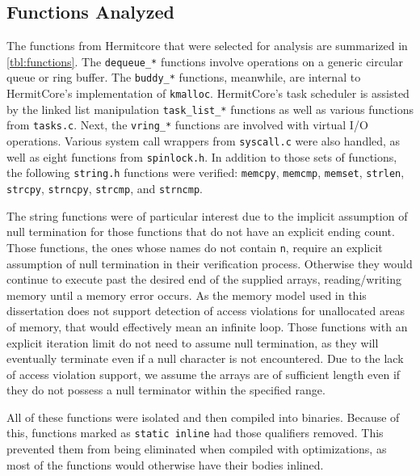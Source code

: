 \subsection{Functions Analyzed}
The functions from Hermitcore that were selected for analysis are summarized in \cref{tbl:functions}.
The \lstinline|dequeue_*| functions involve operations on a generic circular queue or ring buffer.
The \lstinline|buddy_*| functions, meanwhile,
are internal to HermitCore's implementation of \lstinline|kmalloc|.
HermitCore's task scheduler is assisted by the linked list manipulation \lstinline|task_list_*| functions
as well as various functions from \lstinline|tasks.c|.
Next, the \lstinline|vring_*| functions are involved with virtual I/O operations.
Various system call wrappers from \lstinline|syscall.c| were also handled,
as well as eight functions from \lstinline|spinlock.h|.
In addition to those sets of functions,
the following \lstinline|string.h| functions were verified:
\lstinline|memcpy|, \lstinline|memcmp|, \lstinline|memset|, \lstinline|strlen|,
\lstinline|strcpy|, \lstinline|strncpy|, \lstinline|strcmp|, and \lstinline|strncmp|.

The string functions were of particular interest due to the implicit assumption of null termination
for those functions that do not have an explicit ending count.
Those functions, the ones whose names do not contain \lstinline|n|,
require an explicit assumption of null termination in their verification process.
Otherwise they would continue to execute past the desired end of the supplied arrays,
reading/writing memory until a memory error occurs.
As the memory model used in this dissertation
does not support detection of access violations for unallocated areas of memory,
that would effectively mean an infinite loop.
Those functions with an explicit iteration limit do not need to assume null termination,
as they will eventually terminate even if a null character is not encountered.
Due to the lack of access violation support,
we assume the arrays are of sufficient length
even if they do not possess a null terminator within the specified range.

All of these functions were isolated and then compiled into binaries.
Because of this, functions marked as \lstinline|static inline|
had those qualifiers removed.
This prevented them from being eliminated when compiled with optimizations,
as most of the functions would otherwise have their bodies inlined.

